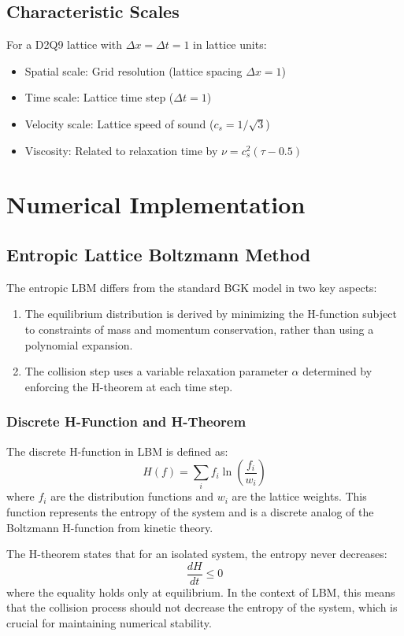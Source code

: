 \documentclass[12pt,a4paper]{article}
\begin{document}
\subsection{Characteristic Scales}
For a D2Q9 lattice with $\Delta x = \Delta t = 1$ in lattice units:
\begin{itemize}
    \item Spatial scale: Grid resolution (lattice spacing $\Delta x = 1$)
    \item Time scale: Lattice time step ($\Delta t = 1$)
    \item Velocity scale: Lattice speed of sound ($c_s = 1/\sqrt{3}$)
    \item Viscosity: Related to relaxation time by $\nu = c_s^2(\tau - 0.5)$
\end{itemize}

\section{Numerical Implementation}

\subsection{Entropic Lattice Boltzmann Method}
The entropic LBM differs from the standard BGK model in two key aspects:
\begin{enumerate}
    \item The equilibrium distribution is derived by minimizing the H-function subject to constraints of mass and momentum conservation, rather than using a polynomial expansion.
    \item The collision step uses a variable relaxation parameter $\alpha$ determined by enforcing the H-theorem at each time step.
\end{enumerate}

\subsubsection{Discrete H-Function and H-Theorem}
The discrete H-function in LBM is defined as:
\begin{equation}
H(f) = \sum_i f_i \ln\left(\frac{f_i}{w_i}\right)
\end{equation}
where $f_i$ are the distribution functions and $w_i$ are the lattice weights. This function represents the entropy of the system and is a discrete analog of the Boltzmann H-function from kinetic theory.

The H-theorem states that for an isolated system, the entropy never decreases:
\begin{equation}
\frac{dH}{dt} \leq 0
\end{equation}
where the equality holds only at equilibrium. In the context of LBM, this means that the collision process should not decrease the entropy of the system, which is crucial for maintaining numerical stability.
\end{document}
